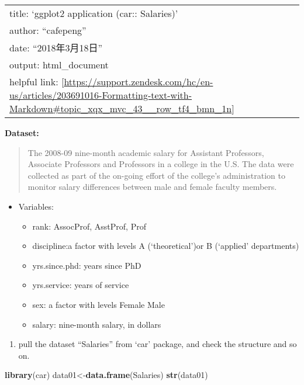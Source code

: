 \documentclass[]{article}
\title{}
\author{}
\date{}
\newenvironment{Shaded}{\begin{snugshade}}{\end{snugshade}}
\newcommand{\KeywordTok}[1]{\textcolor[rgb]{0.13,0.29,0.53}{\textbf{{#1}}}}
\newcommand{\NormalTok}[1]{{#1}}
\providecommand{\tightlist}{%
  \setlength{\itemsep}{0pt}\setlength{\parskip}{0pt}}
\begin{document}
\begin{longtable}[]{@{}l@{}}
\toprule
title: `ggplot2 application (car:: Salaries)'\tabularnewline
author: ``cafepeng''\tabularnewline
date: ``2018年3月18日''\tabularnewline
output: html\_document\tabularnewline
helpful link:
{[}\url{https://support.zendesk.com/hc/en-us/articles/203691016-Formatting-text-with-Markdown\#topic_xqx_mvc_43__row_tf4_bmn_1n}{]}\tabularnewline
\bottomrule
\end{longtable}

\textbf{Dataset:}

\begin{quote}
The 2008-09 nine-month academic salary for Assistant Professors,
Associate Professors and Professors in a college in the U.S. The data
were collected as part of the on-going effort of the college's
administration to monitor salary differences between male and female
faculty members.
\end{quote}

\begin{itemize}
\tightlist
\item
  Variables:

  \begin{itemize}
  \tightlist
  \item
    rank: AssocProf, AsstProf, Prof
  \item
    discipline:a factor with levels A (`theoretical')or B (`applied'
    departments)
  \item
    yrs.since.phd: years since PhD
  \item
    yrs.service: years of service
  \item
    sex: a factor with levels Female Male
  \item
    salary: nine-month salary, in dollars
  \end{itemize}
\end{itemize}

\begin{enumerate}
\def\labelenumi{\arabic{enumi}.}
\tightlist
\item
  pull the dataset ``Salaries'' from `car' package, and check the
  structure and so on.
\end{enumerate}

\begin{Shaded}
\begin{Highlighting}[]
\KeywordTok{library}\NormalTok{(car)}
\NormalTok{data01<-}\KeywordTok{data.frame}\NormalTok{(Salaries)}
\KeywordTok{str}\NormalTok{(data01)}
\end{Highlighting}
\end{Shaded}
\end{document}
